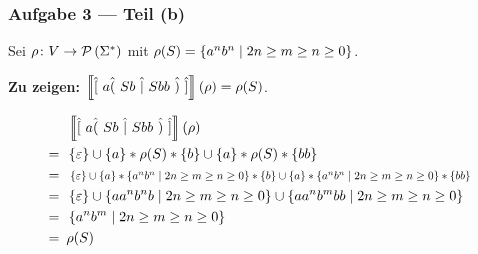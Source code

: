 \documentclass{beamer}
\newcommand{\sem}[1]{\left\llbracket #1 \right\rrbracket}
\begin{document}
\begin{frame} \frametitle{Aufgabe 3 --- Teil (b)}
	\small 
	Sei $\rho \colon V \to \mathcal{P}\left( \Sigma^\ast \right)$ mit $\rho(S) = \left\{ a^n b^n \mid 2n \ge m \ge n \ge 0 \right\}$. 
		
	\textbf{Zu zeigen:} $\sem{\byp{a \opt{Sb}{Sbb}}}(\rho) = \rho(S)$.
	
	\pause
	
	\begin{align*}
		&\sem{\byp{a \opt{Sb}{Sbb}}}(\rho) \\
		= \enskip & \menge{\epsilon} \cup \menge{a} * \rho(S) * \menge{b} \cup \menge{a} * \rho(S) * \menge{bb} \\
		= \enskip & \scalebox{0.8}{ $\menge{\epsilon} \cup \menge{a} * \menge{a^n b^n \mid 2n \ge m \ge n \ge 0} * \menge{b} \cup \menge{a} * \menge{a^n b^n \mid 2n \ge m \ge n \ge 0} * \menge{bb} $} \\
		= \enskip & \menge{\epsilon} \cup \menge{a a^n b^n b \mid 2n \ge m \ge n \ge 0} \cup \menge{a a^n b^m bb \mid 2n \ge m \ge n \ge 0}  \\
		= \enskip & \menge{a^n b^m \mid 2n \ge m \ge n \ge 0} \\
		= \enskip & \rho(S)
	\end{align*}
\end{frame}
\end{document}

